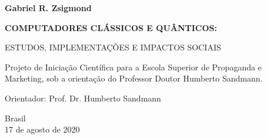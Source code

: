 \begin{titlepage}

    \begin{center}
        
        \textbf{Gabriel R. Zsigmond}
        
        \vspace{3cm}
        
        \LARGE
        \textbf{COMPUTADORES CLÁSSICOS E QUÂNTICOS:}
        
        \vspace{0.5cm}
        \large
        ESTUDOS, IMPLEMENTAÇÕES E IMPACTOS SOCIAIS
        
        \vspace{3.5cm}
        
        \begin{flushright}
        \begin{minipage}{10cm}
        Projeto de Iniciação Científica para a Escola Superior de Propaganda e Marketing, sob a orientação do Professor Doutor Humberto Sandmann.\linebreak[3]
        
        Orientador: Prof. Dr. Humberto Sandmann
        \end{minipage}
        \end{flushright}
        \vfill
        
        Brasil\\
        17 de agosto de 2020\\
        
    \end{center}

\end{titlepage}